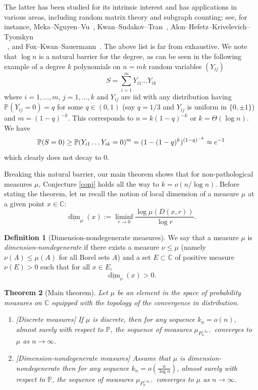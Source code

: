 \documentclass[12pt, reqno]{amsart}
\theoremstyle{plain}
\newtheorem{theorem}{Theorem}[section]
\theoremstyle{definition}
\newtheorem{definition}[theorem]{Definition}
\newcommand\C{{\mathbb{C}}}
\renewcommand\P{{\mathbb{P}}}
\begin{document}
 The latter has been studied for its intrinsic interest and has applications in various areas, including random matrix theory and subgraph counting; see, for instance, Meka--Nguyen--Vu~\cite{meka2015anti}, Kwan--Sudakov--Tran~\cite{kwan2019anticoncentration}, Alon--Hefetz--Krivelevich--Tyomkyn\\~\cite{alon2020edge}, and Fox--Kwan--Sauermann~\cite{fox2021combinatorial}. The above list is far from exhaustive.
 We note that $\log n$ is a natural barrier for the degree, as can be seen in the following example of a degree $k$ polynomials on $n=mk$ random variables $(Y_{ij})$ 
 \begin{equation}\label{eq:counter}
 	S = \sum_{i=1}^{m} Y_{i1}\dots Y_{ik}
 \end{equation}
 where $i=1, \dots, m$, $j=1, \dots, k$ and $Y_{ij}$ are iid with any distribution having $\P(Y_{ij} = 0) =q$ for some $q\in (0, 1)$  (say $q=1/3$ and $Y_{ij}$ is uniform in $\{0, \pm 1\}$) and $m = (1-q)^{-k}$. This corresponds to $n = k(1-q)^{-k}$ or $k=\Theta(\log n)$. We have
 \begin{equation}\label{key}
 	\P(S = 0)\ge \P(Y_{i1}\dots Y_{ik} = 0)^{m} = (1-(1-q)^{k})^{(1-q)^{-k}} \approx e^{-1}\notag
 \end{equation}
 which clearly does not decay to $0$.
 
 
 
 

 

Breaking this natural barrier, our main theorem shows that for non-pathological measures $\mu$, Conjecture \ref{conj} holds all the way to $k = o(n/\log n)$. Before stating the theorem, let us recall the notion of local dimension of a measure $\mu$ at a given point $x\in \C$:
\[
\underline{\dim}_{\mu}(x)
:= \liminf_{r\to 0}
\frac{\log \mu(D(x,r))}{\log r}.
\]
\begin{definition}[Dimension-nondegenerate measures] \label{def:dim}
	 We say that a measure $\mu$ is {\it dimension-nondegenerate} if there exists a measure $\nu\le \mu$ (namely $\nu(A)\le \mu(A)$ for all Borel sets $A$) and a set $E\subset \C$ of positive measure $\nu(E)>0$ such that for all $x\in E$, 
	 $$\underline{\dim}_{\nu}(x)>0.$$
\end{definition}


 \begin{theorem}[Main theorem]\label{thm:main}  Let $\mu$ be an element in the space of probability measures on $\C$ equipped with the topology of the convergence in distribution. 
	\begin{enumerate} 
		\item \label{cond:disc}[Discrete measures] If $\mu$ is discrete, then for any sequence $k_n=o(n)$, almost surely with respect to $\P$, the sequence of measures $\mu_{P_n^{(k_n)}}$ converges to $\mu$ as $n\to \infty$.
		\item \label{cond:nondeg} [Dimension-nondegenerate measures] Assume that $\mu$ is dimension-nondegenerate then for any sequence $k_n=o(\frac{n}{\log n})$, almost surely with respect to $\P$, the sequence of measures $\mu_{P_n^{(k_n)}}$ converges to $\mu$ as $n\to \infty$. 
		\end{enumerate}
\end{theorem} 
 
\end{document}
